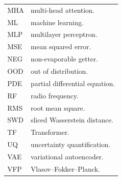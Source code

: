 \begin{longtable}{@{}p{}@{}p{}@{}}
MHA & multi-head attention.\\
ML & machine learning.\\
MLP & multilayer perceptron.\\
MSE & mean squared error.\\
\noalign{\vskip\baselineskip}
NEG & non-evaporable getter.\\
\noalign{\vskip\baselineskip}
OOD & out of distribution.\\
\noalign{\vskip\baselineskip}
PDE & partial differential equation.\\
\noalign{\vskip\baselineskip}
RF & radio frequency.\\
RMS & root mean square.\\
\noalign{\vskip\baselineskip}
SWD & sliced Wasserstein distance.\\
\noalign{\vskip\baselineskip}
TF & Transformer.\\
\noalign{\vskip\baselineskip}
UQ & uncertainty quantification.\\
\noalign{\vskip\baselineskip}
VAE & variational autoencoder.\\
VFP & Vlasov–Fokker–Planck.\\
\end{longtable}
\endgroup
